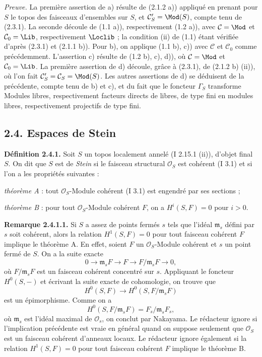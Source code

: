 \documentclass[11pt]{article}
\begin{document}
\emph{Preuve.} La première assertion de a) résulte de (2.1.2 a)) appliqué en prenant pour $S$ le topos des faisceaux d'ensembles sur $S$, et $\mathcal C'_S=\Mod(S)$, compte tenu de (2.3.1). La seconde découle de (1.1 a)), respectivement (1.2 a)), avec $\mathcal C=\Mod$ et $\mathcal C_0=\Lib$, respectivement $\Loclib$ ; la condition (ii) de (1.1) étant vérifiée d'après (2.3.1) et (2.1.1 b)). Pour b), on applique (1.1 b), c)) avec $\mathcal C$ et $\mathcal C_0$ comme précédemment. L'assertion c) résulte de (1.2 b), c), d)), où $\mathcal C=\Mod$ et $\mathcal C_0=\Lib$. La première assertion de d) découle, grâce à (2.3.1), de (2.1.2 b) (ii)), où l'on fait $\mathcal C'_S=\mathcal C_S=\Mod(S)$. Les autres assertions de d) se déduisent de la précédente, compte tenu de b) et c), et du fait que le foncteur $\Gamma_S$ transforme Modules libres, respectivement facteurs directs de libres, de type fini en modules libres, respectivement projectifs de type fini.

\subsection*{2.4. Espaces de Stein}

\textbf{Définition 2.4.1.} Soit $S$ un topos localement annelé (I 2.15.1 (ii)), d'objet final $S$. On dit que $S$ est de \emph{Stein} si le faisceau structural $\mathcal O_S$ est cohérent (I 3.1) et si l'on a les propriétés suivantes :

\emph{théorème A} : tout $\mathcal O_S$-Module cohérent (I 3.1) est engendré par ses sections ;

\emph{théorème B} : pour tout $\mathcal O_S$-Module cohérent $F$, on a $H^i(S,F)=0$ pour $i>0$.

\textbf{Remarque 2.4.1.1.} Si $S$ a assez de points fermés $s$ tels que l'idéal $\mathfrak m_s$ défini par $s$ soit cohérent, alors la relation $H^1(S,F)=0$ pour tout faisceau cohérent $F$ implique le théorème A. En effet, soient $F$ un $\mathcal O_S$-Module cohérent et $s$ un point fermé de $S$. On a la suite exacte
\[
0\longrightarrow\mathfrak m_sF\longrightarrow F\longrightarrow F/\mathfrak m_sF\longrightarrow0,
\]
où $F/\mathfrak m_sF$ est un faisceau cohérent concentré sur $s$. Appliquant le foncteur $H^0(S,-)$ et écrivant la suite exacte de cohomologie, on trouve que
\[
H^0(S,F)\longrightarrow H^0(S,F/\mathfrak m_sF)
\]
est un épimorphisme. Comme on a
\[
H^0(S,F/\mathfrak m_sF)=F_s/\mathfrak m_sF_s,
\]
où $\mathfrak m_s$ est l'idéal maximal de $\mathcal O_s$, on conclut par Nakayama. Le rédacteur ignore si l'implication précédente est vraie en général quand on suppose seulement que $\mathcal O_S$ est un faisceau cohérent d'anneaux locaux. Le rédacteur ignore également si la relation $H^1(S,F)=0$ pour tout faisceau cohérent $F$ implique le théorème B.
\end{document}
